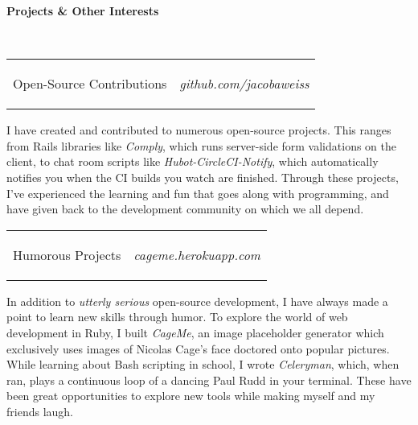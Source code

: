 \documentclass[11pt]{article}
\makeatletter
\newcommand{\headerrow}[2]
{\begin{tabular*}{\linewidth}{l@{\extracolsep{\fill}}r}
	#1 &
	#2 \\
\end{tabular*}}
\makeatother
\begin{document}
\vspace{0.8em}
\begin{LARGE}
	\bf Projects \& Other Interests
\end{LARGE}
\vspace{0.5em} \\
\headerrow
	{\begin{Large}Open-Source Contributions\end{Large}}
	{\textit{github.com/jacobaweiss}}
	\begin{normalsize}
	\hspace*{1.5em}I have created and contributed to numerous open-source projects. This ranges from Rails libraries like {\textit{Comply}}, which runs server-side form validations on the client, to chat room scripts like {\textit{Hubot-CircleCI-Notify}}, which automatically notifies you when the CI builds you watch are finished. Through these projects, I've experienced the learning and fun that goes along with programming, and have given back to the development community on which we all depend. \\
	\end{normalsize}

\headerrow
	{\begin{Large}Humorous Projects\end{Large}}
	{\textit{cageme.herokuapp.com}}
	\begin{normalsize}
	\hspace*{1.5em}In addition to {\textit{utterly serious}} open-source development, I have always made a point to learn new skills through humor. To explore the world of web development in Ruby, I built {\textit{CageMe}}, an image placeholder generator which exclusively uses images of Nicolas Cage's face doctored onto popular pictures. While learning about Bash scripting in school, I wrote {\textit{Celeryman}}, which, when ran, plays a continuous loop of a dancing Paul Rudd in your terminal. These have been great opportunities to explore new tools while making myself and my friends laugh. \\
	\end{normalsize}
\end{document}
